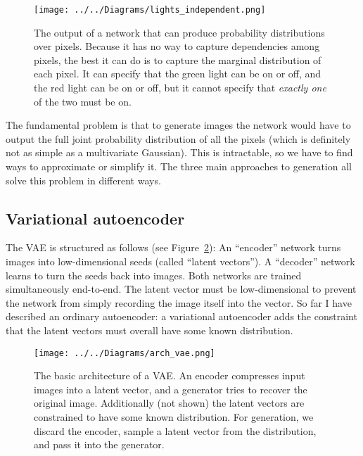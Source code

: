\documentclass[11pt, a4paper, openany]{book}
\newcommand{\nquote}[1]{``{#1}''}
\begin{document}
\begin{figure}
  \centering
  \texttt{[image: ../../Diagrams/lights\_independent.png]}
  \caption[Output of a network that can produce probability distributions]{The output of a network that can produce probability distributions over pixels. Because it has no way to capture dependencies among pixels, the best it can do is to capture the marginal distribution of each pixel. It can specify that the green light can be on or off, and the red light can be on or off, but it cannot specify that \emph{exactly one} of the two must be on.}
  \label{independent}
\end{figure}

The fundamental problem is that to generate images the network would have to output the full joint probability distribution of all the pixels (which is definitely not as simple as a multivariate Gaussian). This is intractable, so we have to find ways to approximate or simplify it. The three main approaches to generation all solve this problem in different ways.

\subsection{Variational autoencoder}

The VAE \citep{vae} is structured as follows (see Figure~\ref{archvae}): An \nquote{encoder} network turns images into low-dimensional seeds (called \nquote{latent vectors}). A \nquote{decoder} network learns to turn the seeds back into images. Both networks are trained simultaneously end-to-end. The latent vector must be low-dimensional to prevent the network from simply recording the image itself into the vector. So far I have described an ordinary autoencoder: a variational autoencoder adds the constraint that the latent vectors must overall have some known distribution.

\begin{figure}
  \centering
  \texttt{[image: ../../Diagrams/arch\_vae.png]}
  \caption[Architecture of a VAE]{The basic architecture of a VAE. An encoder compresses input images into a latent vector, and a generator tries to recover the original image. Additionally (not shown) the latent vectors are constrained to have some known distribution. For generation, we discard the encoder, sample a latent vector from the distribution, and pass it into the generator.}
  \label{archvae}
\end{figure}
\end{document}
